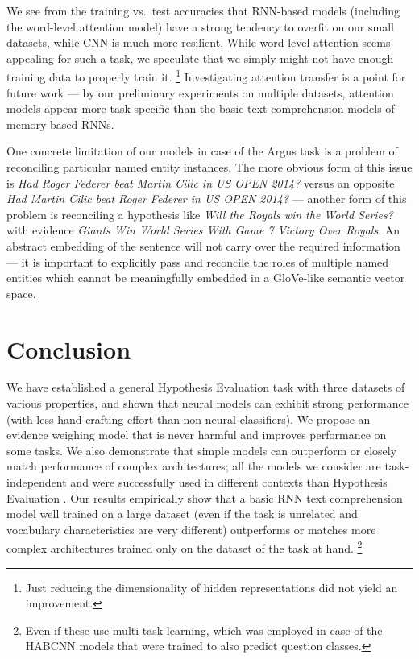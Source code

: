 \documentclass[11pt]{article}
\begin{document}
We see from the training vs.\ test accuracies that RNN-based
models (including the word-level attention model) have a strong tendency
to overfit on our small datasets, while CNN is much more resilient.
While word-level attention seems appealing for such a task,
we speculate that we simply might not have enough training data to
properly train it.%
\footnote{Just reducing the dimensionality of hidden representations did not yield an improvement.}
Investigating attention transfer is a point for future work --- by our
preliminary experiments on multiple datasets, attention
models appear more task specific than the basic text comprehension models
of memory based RNNs.



One concrete limitation of our models in case of the Argus task
is a problem of reconciling particular named entity instances.
The more obvious form of this issue is \textit{Had Roger Federer beat Martin Cilic in US OPEN 2014?}
versus an opposite \textit{Had Martin Cilic beat Roger Federer in US OPEN 2014?} ---
another form of this problem is reconciling a hypothesis like
\textit{Will the Royals win the World Series?}
with evidence
\textit{Giants Win World Series With Game 7 Victory Over Royals}.
An abstract embedding of the sentence will not carry over the required
information --- it is important to explicitly pass and reconcile the roles
of multiple named entities which cannot be meaningfully embedded in a GloVe-like
semantic vector space.


\section{Conclusion}
\label{sec:concl}

We have established a general Hypothesis Evaluation task with three datasets
of various properties, and shown that neural models can exhibit strong
performance (with less hand-crafting effort than non-neural classifiers).
We propose an evidence weighing model that is never harmful and improves
performance on some tasks.
We also demonstrate that simple models can outperform or closely match
performance of complex architectures;
all the models we consider are task-independent and were successfully
used in different contexts than Hypothesis Evaluation \cite{sps}.
Our results empirically show that a basic RNN text comprehension model
well trained on a large dataset (even if the task is unrelated and vocabulary
characteristics are very different) outperforms or matches more complex
architectures trained only on the dataset of the task at hand.%
\footnote{Even if these use multi-task learning, which was employed in case
of the HABCNN models that were trained to also predict question classes.}
\end{document}
